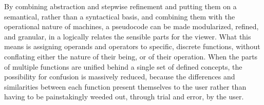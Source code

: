 \documentclass[10pt,a4paper,oneside]{scrartcl}
\begin{document}
By combining abstraction and stepwise refinement and putting them on a semantical, rather than a syntactical basis, and combining them with the operational nature of machines, a pseudocode can be made modularized, refined, and granular, in a logically relates the sensible parts for the viewer. What this means is assigning operands and operators to specific, discrete functions, without conflating either the nature of their being, or of their operation. When the parts of multiple functions are unified behind a single set of defined concepts, the possibility for confusion is massively reduced, because the differences and similarities between each function present themselves to the user rather than having to be painstakingly weeded out, through trial and error, by the user.
\par
\end{document}
